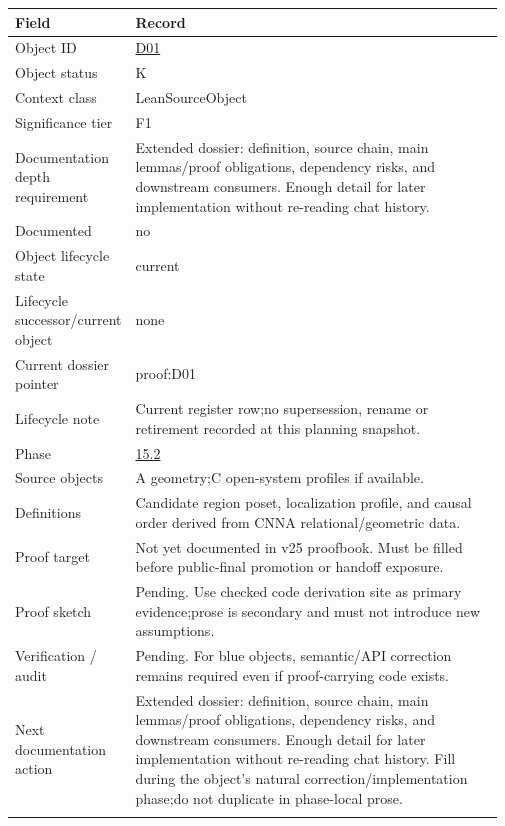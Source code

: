 \begin{longtable}{L{0.16\linewidth} L{0.81\linewidth}}
\hline
\textbf{Field} & \textbf{Record}\\
\hline
Object ID & \hyperlink{object-row-D01}{D01}\\
\hline\addlinespace[0.20em]
Object status & K\\
\hline\addlinespace[0.20em]
Context class & LeanSourceObject\\
\hline\addlinespace[0.20em]
Significance tier & F1\\
\hline\addlinespace[0.20em]
Documentation depth requirement & Extended dossier: definition, source chain, main lemmas/\allowbreak{}proof obligations, dependency risks, and downstream consumers. Enough detail for later implementation without re-reading chat history.\\
\hline\addlinespace[0.20em]
Documented & no\\
\hline\addlinespace[0.20em]
Object lifecycle state & current\\
\hline\addlinespace[0.20em]
Lifecycle successor/\allowbreak{}current object & none\\
\hline\addlinespace[0.20em]
Current dossier pointer & proof:D01\\
\hline\addlinespace[0.20em]
Lifecycle note & Current register row;\newline no supersession, rename or retirement recorded at this planning snapshot.\\
\hline\addlinespace[0.20em]
Phase & \hyperlink{phase-row-15-2}{15.2}\\
\hline\addlinespace[0.20em]
Source objects & A geometry;\newline C open-system profiles if available.\\
\hline\addlinespace[0.20em]
Definitions & Candidate region poset, localization profile, and causal order derived from CNNA relational/\allowbreak{}geometric data.\\
\hline\addlinespace[0.20em]
Proof target & Not yet documented in v25 proofbook. Must be filled before public-final promotion or handoff exposure.\\
\hline\addlinespace[0.20em]
Proof sketch & Pending. Use checked code derivation site as primary evidence;\newline prose is secondary and must not introduce new assumptions.\\
\hline\addlinespace[0.20em]
Verification /\allowbreak{} audit & Pending. For blue objects, semantic/\allowbreak{}API correction remains required even if proof-carrying code exists.\\
\hline\addlinespace[0.20em]
Next documentation action & Extended dossier: definition, source chain, main lemmas/\allowbreak{}proof obligations, dependency risks, and downstream consumers. Enough detail for later implementation without re-reading chat history. Fill during the object's natural correction/\allowbreak{}implementation phase;\newline do not duplicate in phase-local prose.\\
\hline\addlinespace[0.20em]
\end{longtable}
